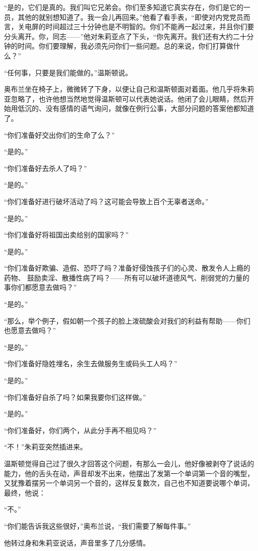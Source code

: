 ``是的，它们是真的。我们叫它兄弟会。你们至多知道它真实存在，你们是它的一员，其他的就别想知道了。我一会儿再回来。''他看了看手表，``即使对内党党员而言，关电屏的时间超过三十分钟也是不明智的。你们不能再一起过来，并且你们要分头离开。你，同志------''他对朱莉亚点了下头，``你先离开。我们还有大约二十分钟的时间。你们要理解，我必须先问你们一些问题。总的来说，你们打算做什么？''

``任何事，只要是我们能做的。''温斯顿说。

奥布兰坐在椅子上，微微转了下身，以便让自己和温斯顿面对着面。他几乎将朱莉亚忽略了，也许他想当然地觉得温斯顿可以代表她说话。他闭了会儿眼睛，然后开始用低沉的、没有感情的语气询问，就像在例行公事，大部分问题的答案他都知道了。

``你们准备好交出你们的生命了么？''

``是的。''

``你们准备好去杀人了吗？''

``是的。''

``你们准备好进行破坏活动了吗？这可能会导致上百个无辜者送命。''

``是的。''

``你们准备好将祖国出卖给别的国家吗？''

``是的。''

``你们准备好欺骗、造假、恐吓了吗？准备好侵蚀孩子们的心灵、散发令人上瘾的药物、
鼓励卖淫、散播性病了吗？------所有可以破坏道德风气、削弱党的力量的事你们都愿意去做吗？''

``是的。''

``那么，举个例子，假如朝一个孩子的脸上泼硫酸会对我们的利益有帮助------你们也愿意去做吗？''

``是的。''

``你们准备好隐姓埋名，余生去做服务生或码头工人吗？''

``是的。''

``你们准备好自杀了吗？如果我要你们这样做。''

``是的。''

``你们准备好，你们两个，从此分手再不相见吗？''

``不！''朱莉亚突然插进来。

温斯顿觉得自己过了很久才回答这个问题，有那么一会儿，他好像被剥夺了说话的能力，他的舌头在动，声音却发不出来，他摆出了发第一个单词第一个音的嘴型，又犹豫着摆另一个单词另一个音的，这样反复数次，自己也不知道要说哪个单词，最终，他说：

``不。''

``你们能告诉我这些很好，''奥布兰说，``我们需要了解每件事。''

他转过身和朱莉亚说话，声音里多了几分感情。

